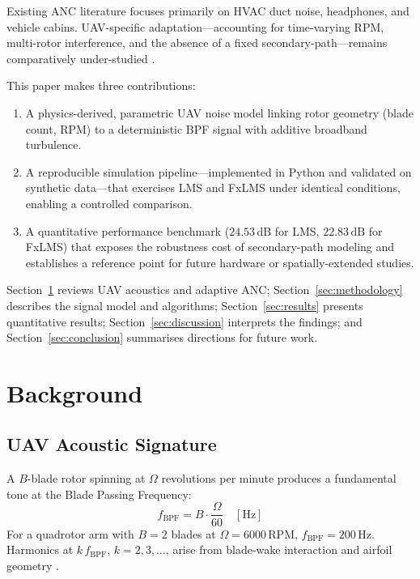 \documentclass[journal,12pt,onecolumn]{IEEEtran}
\newcommand{\SI}[2]{\ensuremath{#1\,\mathrm{#2}}}
\newcommand{\si}[1]{\ensuremath{\mathrm{#1}}}
\begin{document}
Existing ANC literature focuses primarily on HVAC duct noise, headphones,
and vehicle cabins.
UAV-specific adaptation—accounting for time-varying RPM, multi-rotor
interference, and the absence of a fixed secondary-path—remains
comparatively under-studied \cite{torija2022,strauss2023}.

This paper makes three contributions:
\begin{enumerate}
  \item A physics-derived, parametric UAV noise model linking rotor
        geometry (blade count, RPM) to a deterministic BPF signal with
        additive broadband turbulence.
  \item A reproducible simulation pipeline—implemented in Python and
        validated on synthetic data—that exercises LMS and FxLMS under
        identical conditions, enabling a controlled comparison.
  \item A quantitative performance benchmark (\SI{24.53}{dB} for LMS,
        \SI{22.83}{dB} for FxLMS) that exposes the robustness
        cost of secondary-path modeling and establishes a reference point
        for future hardware or spatially-extended studies.
\end{enumerate}

Section~\ref{sec:background} reviews UAV acoustics and adaptive ANC;
Section~\ref{sec:methodology} describes the signal model and algorithms;
Section~\ref{sec:results} presents quantitative results;
Section~\ref{sec:discussion} interprets the findings; and
Section~\ref{sec:conclusion} summarises directions for future work.

\section{Background}
\label{sec:background}

\subsection{UAV Acoustic Signature}

A $B$-blade rotor spinning at $\Omega$ revolutions per minute produces a
fundamental tone at the Blade Passing Frequency:
\begin{equation}
  f_{\text{BPF}} = B \cdot \frac{\Omega}{60} \quad [\si{Hz}]
  \label{eq:bpf}
\end{equation}
For a quadrotor arm with $B=2$ blades at $\Omega = \SI{6000}{RPM}$,
$f_{\text{BPF}} = \SI{200}{Hz}$.
Harmonics at $k\,f_{\text{BPF}}$, $k = 2,3,\ldots$, arise from blade-wake
interaction and airfoil geometry \cite{torija2022}.
\end{document}
